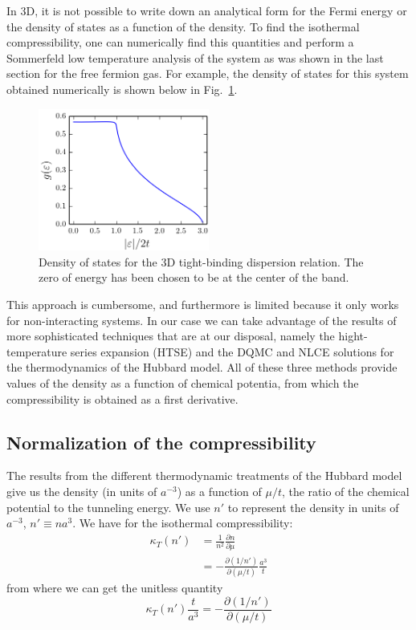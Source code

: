 \documentclass[11pt,letter]{article}
\begin{document}
In 3D, it is not possible to write down an analytical form for the Fermi energy
or the density of states as a function of the density.  To find the isothermal
compressibility,  one can numerically find this quantities and perform a
Sommerfeld low temperature analysis of the system as was shown in the last
section for the free fermion gas.  For example, the density of states for this
system obtained numerically is shown below in Fig.~\ref{fig:g(E)tightbinding}. 
\begin{figure}[H]
    \centering
\includegraphics[width=0.5\textwidth]{figures/DOS_3D_tight-binding.png} \caption{
Density of states for the 3D tight-binding dispersion relation.  The zero of
energy has been chosen to be at the center of the band. }
\label{fig:g(E)tightbinding}
\end{figure}
This approach is cumbersome, and furthermore is limited because it only works
for non-interacting systems.   In our case we can take advantage of the results
of more sophisticated techniques that are at our disposal,  namely the
hight-temperature series expansion (HTSE) and the DQMC and NLCE solutions for
the thermodynamics of the Hubbard model.   All of these three methods provide
values of the density as a function of chemical potentia, from which the
compressibility is obtained as a first derivative.  

\subsection{Normalization of the compressibility} 

The results from the different thermodynamic treatments of the Hubbard model
give us the density (in units of $a^{-3}$) as a function of  $\mu/t$, the ratio
of the chemical potential to the tunneling energy.  We use $n'$ to represent
the density in units of $a^{-3}$,  $n'\equiv n a^{3}$.   We have for the
isothermal compressibility:
\begin{equation} 
\begin{split} 
  \kappa_{T}( n' )  &  =   \frac{1}{n^{2}} \frac{ \partial n }{ \partial \mu}  \\
    &   = - \frac{ \partial ( 1/n') } { \partial ( \mu/t ) }  \frac {a^{3}}{ t } 
\end{split}
\end{equation}
from where we can get the unitless quantity
\begin{equation} 
   \kappa_{T}(n') \frac{t }{ a^{3}} =  
    - \frac{ \partial ( 1/n') } { \partial ( \mu/t ) }
\end{equation}
\end{document}
